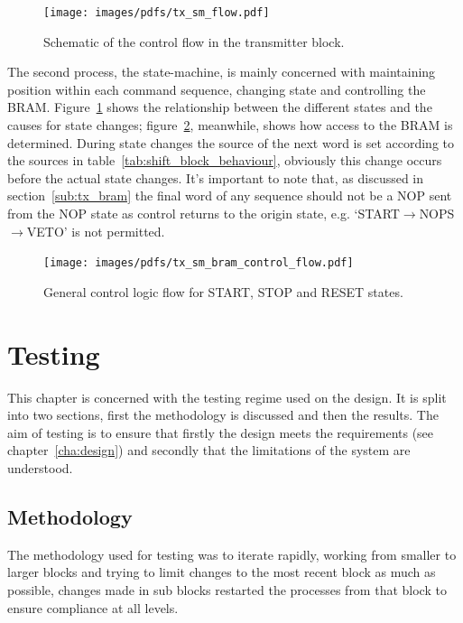 \begin{figure}[htbp]
  \centering
  \texttt{[image: images/pdfs/tx\_sm\_flow.pdf]}
  \caption{Schematic of the control flow in the transmitter block.}
  \label{fig:tx_sm_flow}
\end{figure}
    
The second process, the state-machine, is mainly concerned with maintaining position within each command sequence, changing state and controlling the BRAM. Figure~\ref{fig:tx_sm_flow} shows the relationship between the different states and the causes for state changes; figure~\ref{fig:tx_sm_bram_control_flow}, meanwhile, shows how access to the BRAM is determined. During state changes the source of the next word is set according to the sources in table~\ref{tab:shift_block_behaviour}, obviously this change occurs before the actual state changes. It's important to note that, as discussed in section~\ref{sub:tx_bram} the final word of any sequence should not be a NOP sent from the NOP state as control returns to the origin state, e.g. `START\( \rightarrow \)NOPS\( \rightarrow \)VETO' is not permitted. 
    
\begin{figure}[htbp]
  \centering
  \texttt{[image: images/pdfs/tx\_sm\_bram\_control\_flow.pdf]}
  \caption{General control logic flow for START, STOP and RESET states.}
  \label{fig:tx_sm_bram_control_flow}
\end{figure}

\chapter{Testing} %
\label{cha:testing}
This chapter is concerned with the testing regime used on the design. It is split into two sections, first the methodology is discussed and then the results. The aim of testing is to ensure that firstly the design meets the requirements (see chapter~\ref{cha:design}) and secondly that the limitations of the system are understood.
\section{Methodology} %
\label{sec:methodology}
The methodology used for testing was to iterate rapidly, working from smaller to larger blocks and trying to limit changes to the most recent block as much as possible, changes made in sub blocks restarted the processes from that block to ensure compliance at all levels. 

